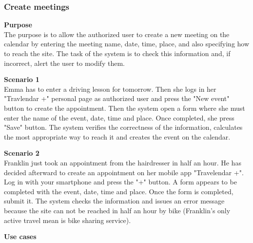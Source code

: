 \documentclass{article}
\begin{document}
	\subsubsection{Create meetings}
	
	\bigskip
	\noindent
	\textbf{Purpose} \\
	The purpose is to allow the authorized user to create a new meeting on the calendar by entering the meeting name, date, time, place, and also specifying how to reach the site. The task of the system is to check this information and, if incorrect, alert the user to modify them.
	
	\bigskip
	\noindent
	\textbf{Scenario 1} \\
	Emma has to enter a driving lesson for tomorrow. Then she logs in her "Travlendar +" personal page as authorized user and press the "New event" button to create the appointment. Then the system open a form where she must enter the name of the event, date, time and place. Once completed, she press "Save" button. The system verifies the correctness of the information, calculates the most appropriate way to reach it and creates the event on the calendar.
	
	\bigskip
	\noindent
	\textbf{Scenario 2} \\
	Franklin just took an appointment from the hairdresser in half an hour. He has decided afterward to create an appointment on her mobile app "Travelendar +". Log in with your smartphone and press the "+" button. A form appears to be completed with the event, date, time and place. Once the form is completed, submit it. The system checks the information and issues an error message because the site can not be reached in half an hour by bike (Franklin’s only active travel mean is bike sharing service).
	
	\bigskip
	\noindent
	\textbf{Use cases} \\
	
\end{document}
